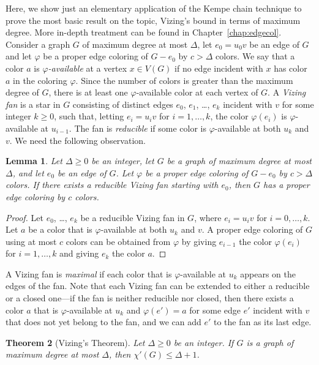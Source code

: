 \documentclass[12pt,twoside,openright,a4paper]{book}
\newtheorem{theorem}{Theorem}[chapter]
\newtheorem{lemma}[theorem]{Lemma}
\begin{document}
Here, we show just an elementary application of the Kempe chain technique to prove the most basic result
on the topic, Vizing's bound in terms of maximum degree.  More in-depth treatment can be found in Chapter~\ref{chap:edgecol}.
Consider a graph $G$ of maximum degree at most $\Delta$, let $e_0=u_0v$ be an edge of $G$ and let $\varphi$ be a proper edge coloring
of $G-e_0$ by $c>\Delta$ colors.  We say that a color $a$ is \emph{$\varphi$-available} at a vertex $x\in V(G)$ if no edge incident
with $x$ has color $a$ in the coloring $\varphi$.  Since the number of colors is greater than the maximum degree of $G$,
there is at least one $\varphi$-available color at each vertex of $G$.  A \emph{Vizing fan} is a star in $G$ consisting of distinct edges
$e_0$, $e_1$, \ldots, $e_k$ incident with $v$ for some integer $k\ge 0$, such that, letting $e_i=u_iv$ for $i=1,\ldots, k$,
the color $\varphi(e_i)$ is $\varphi$-available at $u_{i-1}$.  The fan is \emph{reducible} if some color is
$\varphi$-available at both $u_k$ and $v$.  We need the following observation.
\begin{lemma}\label{lemma:redufan}
Let $\Delta\ge 0$ be an integer, let $G$ be a graph of maximum degree at most $\Delta$, and let $e_0$ be an edge of $G$.
Let $\varphi$ be a proper edge coloring of $G-e_0$ by $c>\Delta$ colors.  If there exists a reducible Vizing fan
starting with $e_0$, then $G$ has a proper edge coloring by $c$ colors.
\end{lemma}
\begin{proof}
Let $e_0$, \ldots, $e_k$ be a reducible Vizing fan in $G$, where $e_i=u_iv$ for $i=0,\ldots,k$.
Let $a$ be a color that is $\varphi$-available at both $u_k$ and $v$.
A proper edge coloring of $G$ using at most $c$ colors can be obtained from $\varphi$ by giving $e_{i-1}$
the color $\varphi(e_i)$ for $i=1,\ldots,k$ and giving $e_k$ the color $a$.
\end{proof}
A Vizing fan is \emph{maximal} if each color that is $\varphi$-available at $u_k$
appears on the edges of the fan.  Note that each Vizing fan can be extended to either a reducible or a closed one---if
the fan is neither reducible nor closed, then there exists a color $a$ that is $\varphi$-available at $u_k$ and $\varphi(e')=a$ for
some edge $e'$ incident with $v$ that does not yet belong to the fan, and we can add $e'$ to the fan as its last edge.
\begin{theorem}[Vizing's Theorem]
Let $\Delta\ge 0$ be an integer.  If $G$ is a graph of maximum degree at most $\Delta$, then $\chi'(G)\le\Delta+1$.
\end{theorem}
\end{document}
